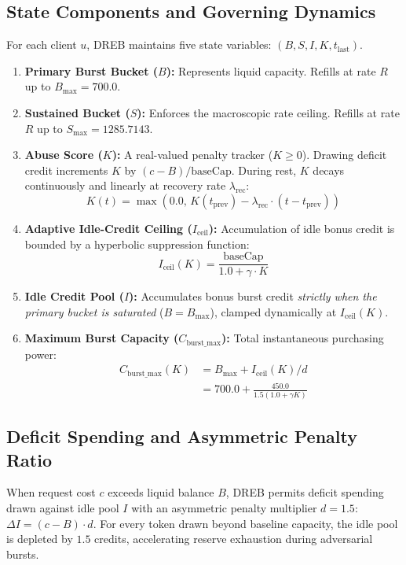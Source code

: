\documentclass[conference]{IEEEtran}
\begin{document}
\subsection{State Components and Governing Dynamics}
For each client $u$, DREB maintains five state variables: $(B, S, I, K, t_{\text{last}})$.
\begin{enumerate}
    \item \textbf{Primary Burst Bucket ($B$):} Represents liquid capacity. Refills at rate $R$ up to $B_{\max} = 700.0$.
    \item \textbf{Sustained Bucket ($S$):} Enforces the macroscopic rate ceiling. Refills at rate $R$ up to $S_{\max} = 1285.7143$.
    \item \textbf{Abuse Score ($K$):} A real-valued penalty tracker ($K \ge 0$). Drawing deficit credit increments $K$ by $(c - B)/\text{baseCap}$. During rest, $K$ decays continuously and linearly at recovery rate $\lambda_{\text{rec}}$:
    \begin{equation}
    K(t) = \max\left(0.0, \, K(t_{\text{prev}}) - \lambda_{\text{rec}} \cdot (t - t_{\text{prev}})\right)
    \end{equation}
    \item \textbf{Adaptive Idle-Credit Ceiling ($I_{\text{ceil}}$):} Accumulation of idle bonus credit is bounded by a hyperbolic suppression function:
    \begin{equation}
    I_{\text{ceil}}(K) = \frac{\text{baseCap}}{1.0 + \gamma \cdot K}
    \end{equation}
    \item \textbf{Idle Credit Pool ($I$):} Accumulates bonus burst credit \textit{strictly when the primary bucket is saturated} ($B = B_{\max}$), clamped dynamically at $I_{\text{ceil}}(K)$.
    \item \textbf{Maximum Burst Capacity ($C_{\text{burst\_max}}$):} Total instantaneous purchasing power:
    \begin{align}
    C_{\text{burst\_max}}(K) &= B_{\max} + I_{\text{ceil}}(K)/d \nonumber \\
    &= 700.0 + \frac{450.0}{1.5(1.0 + \gamma K)}
    \end{align}
\end{enumerate}

\subsection{Deficit Spending and Asymmetric Penalty Ratio}
When request cost $c$ exceeds liquid balance $B$, DREB permits deficit spending drawn against idle pool $I$ with an asymmetric penalty multiplier $d = 1.5$: $\Delta I = (c - B) \cdot d$. For every token drawn beyond baseline capacity, the idle pool is depleted by $1.5$ credits, accelerating reserve exhaustion during adversarial bursts.
\end{document}
